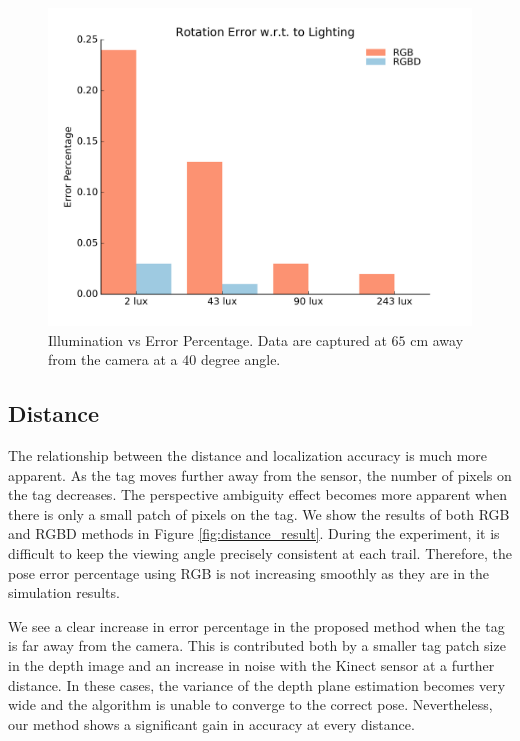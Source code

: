 \begin{figure}
\centering
\includegraphics[width=\columnwidth]{figs/lighting_fig1}
\caption{Illumination vs Error Percentage. Data are captured at $65$ cm away from the camera at a $40$ degree angle.}
\label{fig:lighting_result}
\end{figure}

\subsection{Distance}

The relationship between the distance and localization accuracy is much more apparent. As the tag moves further away from the sensor, the number of pixels on the tag decreases. The perspective ambiguity effect becomes more apparent when there is only a small patch of pixels on the tag. We show the results of  both RGB and RGBD methods in Figure \ref{fig:distance_result}. During the experiment, it is difficult to keep the viewing angle precisely consistent at each trail. Therefore, the pose error percentage using RGB is not increasing smoothly as they are in the simulation results.

We see a clear increase in error percentage in the proposed method when the tag is far away from the camera. This is contributed both by a smaller tag patch size in the depth image and an increase in noise with the Kinect sensor at a further distance. In these cases, the variance of the depth plane estimation becomes very wide and the algorithm is unable to converge to the correct pose. Nevertheless, our method shows a significant gain in accuracy at every distance.


